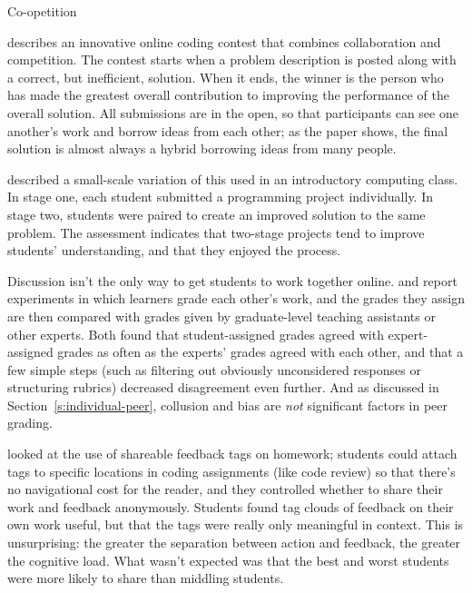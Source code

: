 \begin{aside}{Co-opetition}

\cite{Gull2004} describes an innovative online coding contest that
combines collaboration and competition. The contest starts when a
problem description is posted along with a correct, but inefficient,
solution. When it ends, the winner is the person who has made the
greatest overall contribution to improving the performance of the
overall solution. All submissions are in the open, so that
participants can see one another's work and borrow ideas from each
other; as the paper shows, the final solution is almost always a
hybrid borrowing ideas from many people.

\cite{Batt2018} described a small-scale variation of this used in
an introductory computing class. In stage one, each student submitted
a programming project individually. In stage two, students were paired
to create an improved solution to the same problem. The assessment
indicates that two-stage projects tend to improve students'
understanding, and that they enjoyed the process.

\end{aside}

Discussion isn't the only way to get students to work together online.
\cite{Pare2008} and \cite{Kulk2013} report experiments in which
learners grade each other's work, and the grades they assign are then
compared with grades given by graduate-level teaching assistants or
other experts. Both found that student-assigned grades agreed with
expert-assigned grades as often as the experts' grades agreed with each
other, and that a few simple steps (such as filtering out obviously
unconsidered responses or structuring rubrics) decreased disagreement
even further. And as discussed in Section~\ref{s:individual-peer},
collusion and bias are \emph{not} significant factors in peer grading.

\cite{Cumm2011} looked at the use of shareable feedback tags on
homework; students could attach tags to specific locations in coding
assignments (like code review) so that there's no navigational cost for
the reader, and they controlled whether to share their work and feedback
anonymously. Students found tag clouds of feedback on their own work
useful, but that the tags were really only meaningful in context. This
is unsurprising: the greater the separation between action and feedback,
the greater the cognitive load. What wasn't expected was that the best
and worst students were more likely to share than middling students.

